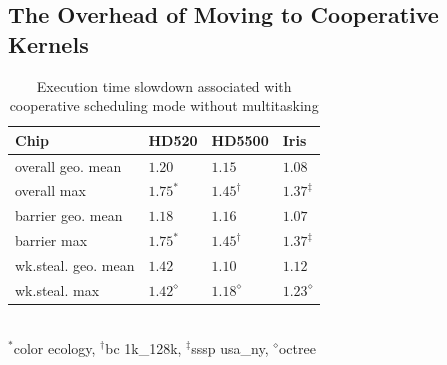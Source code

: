 \documentclass[numbers,nocopyrightspace,10pt]{sigplanconf}
\newcommand{\mytablong}{Table~}
\begin{document}


\subsection{The Overhead of Moving to Cooperative Kernels}\label{sec:overhead}


\begin{table}
\small
\centering
\begin{tabular}{ l l l l }
Chip & HD520 & HD5500 & Iris\\
\hline
overall geo. mean  & $1.20$ & $1.15$ & $1.08$ \\
overall max & $1.75^{\ast}$ & $1.45^{\dagger}$ & $1.37^{\ddagger}$ \\

\hline
barrier geo. mean & $1.18$ & $1.16$ & $1.07$ \\
barrier max & $1.75^{\ast}$ & $1.45^{\dagger}$ & $1.37^{\ddagger}$ \\

\hline
wk.steal. geo. mean & $1.42$ & $1.10$ & $1.12$ \\
wk.steal. max & $1.42^{\diamond}$ & $1.18^{\diamond}$ & $1.23^{\diamond}$ \\

\hline
\end{tabular}\\
{\footnotesize
$^{\ast}$color ecology, $^{\dagger}$bc 1k\_128k, $^{\ddagger}$sssp usa\_ny, $^{\diamond}$octree
}
\caption{Execution time slowdown associated with cooperative scheduling mode without multitasking}
\label{tab:overhead}
\end{table}
\end{document}

